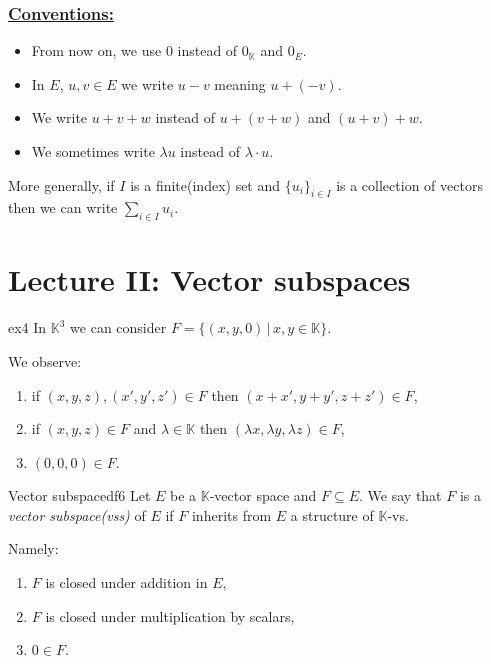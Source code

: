 \documentclass[11pt, a4paper]{article}
\newcommand{\K}{\mathbb{K}}
\begin{document}
\subsubsection*{\underline{Conventions:}}
\begin{itemize}
  \item From now on, we use $0$ instead of $0_\K$ and $0_E$.
  \item In $E$, $u, v \in E$ we write $u - v$ meaning $u + (-v)$.
  \item We write $u + v + w$ instead of $u + (v + w)$ and $(u + v) + w$.
  \item We sometimes write $\lambda u$ instead of $\lambda \cdot u$.
\end{itemize}

More generally, if $I$ is a finite(index) set and $\{u_i\}_{i \in I}$ is a collection of vectors then we can write $\displaystyle \sum_{i \in I} u_i$.

\section{Lecture II: Vector subspaces}

\begin{example}{}{ex4}
  In $\K ^3$ we can consider $F = \{ (x, y, 0) \, | \, x, y \in \K \}$.
  
  We observe:
  \begin{enumerate}
    \item if $(x, y, z), (x', y', z') \in F$ then $(x + x', y + y', z + z') \in F$,
    \item if $(x, y, z) \in F$ and $\lambda \in \K$ then $(\lambda x, \lambda y, \lambda z) \in F$,
    \item $(0, 0, 0) \in F$.
  \end{enumerate}
\end{example}

\begin{definition}{Vector subspace}{df6}
  Let $E$ be a $\K$-vector space and $F \subseteq E$. We say that $F$ is a \emph{vector subspace(vss)} of $E$ if $F$ inherits from $E$ a structure of $\K$-vs.
  
  Namely:
  \begin{enumerate}
    \item $F$ is closed under addition in $E$,
    \item $F$ is closed under multiplication by scalars,
    \item $0 \in F$.
  \end{enumerate}
\end{definition}
\end{document}
